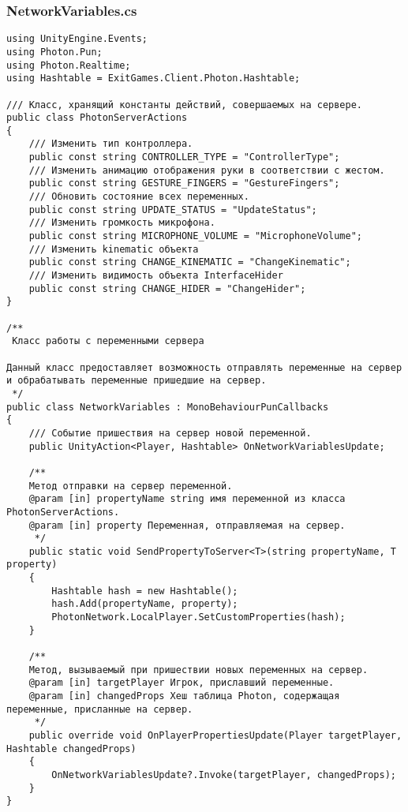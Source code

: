 \subsubsection*{NetworkVariables.cs}
\begin{verbatim}
﻿using UnityEngine.Events;
using Photon.Pun;
using Photon.Realtime;
using Hashtable = ExitGames.Client.Photon.Hashtable;

/// Класс, хранящий константы действий, совершаемых на сервере.
public class PhotonServerActions
{
    /// Изменить тип контроллера.
    public const string CONTROLLER_TYPE = "ControllerType";
    /// Изменить анимацию отображения руки в соответствии с жестом.
    public const string GESTURE_FINGERS = "GestureFingers";
    /// Обновить состояние всех переменных.
    public const string UPDATE_STATUS = "UpdateStatus";
    /// Изменить громкость микрофона.
    public const string MICROPHONE_VOLUME = "MicrophoneVolume";
    /// Изменить kinematic объекта
    public const string CHANGE_KINEMATIC = "ChangeKinematic";
    /// Изменить видимость объекта InterfaceHider
    public const string CHANGE_HIDER = "ChangeHider";
}

/**
 Класс работы с переменными сервера

Данный класс предоставляет возможность отправлять переменные на сервер 
и обрабатывать переменные пришедшие на сервер. 
 */
public class NetworkVariables : MonoBehaviourPunCallbacks
{
    /// Событие пришествия на сервер новой переменной.
    public UnityAction<Player, Hashtable> OnNetworkVariablesUpdate;

    /**
    Метод отправки на сервер переменной.
    @param [in] propertyName string имя переменной из класса PhotonServerActions.
    @param [in] property Переменная, отправляемая на сервер.
     */
    public static void SendPropertyToServer<T>(string propertyName, T property)
    {
        Hashtable hash = new Hashtable();
        hash.Add(propertyName, property);
        PhotonNetwork.LocalPlayer.SetCustomProperties(hash);
    }

    /**
    Метод, вызываемый при пришествии новых переменных на сервер.
    @param [in] targetPlayer Игрок, приславший переменные.
    @param [in] changedProps Хеш таблица Photon, содержащая переменные, присланные на сервер.
     */
    public override void OnPlayerPropertiesUpdate(Player targetPlayer, Hashtable changedProps)
    {
        OnNetworkVariablesUpdate?.Invoke(targetPlayer, changedProps);
    }
}

\end{verbatim}
